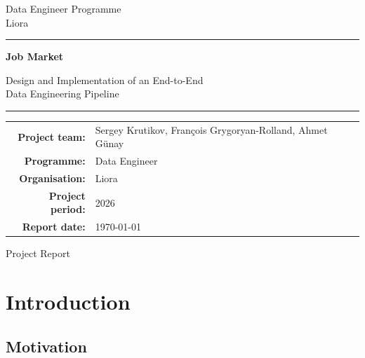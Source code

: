 \documentclass[11pt,a4paper]{article}
\begin{document}
\begin{titlepage}
	\centering
	
	\vspace*{2cm}
	
	{\large
		Data Engineer Programme\\
		Liora
		\par}
	
	\vspace{2.5cm}
	
	{\color{titleblue}\rule{\textwidth}{1.5pt}}
	
	\vspace{0.8cm}
	
	{\Huge\bfseries
		Job Market
		\par}
	
	\vspace{0.5cm}
	
	{\Large
		Design and Implementation of an End-to-End\\
		Data Engineering Pipeline
		\par}
	
	\vspace{0.8cm}
	
	{\color{titleblue}\rule{\textwidth}{1.5pt}}
	
	\vfill
	
	\begin{tabular}{rl}
		\textbf{Project team:} &
		Sergey Krutikov, François Grygoryan-Rolland, Ahmet Günay\\[0.5cm]
		
		\textbf{Programme:} & Data Engineer \\[0.2cm]
		\textbf{Organisation:} & Liora \\[0.2cm]
		\textbf{Project period:} & 2026 \\[0.2cm]
		\textbf{Report date:} & \today
	\end{tabular}
	
	\vfill
	
	{\small
		Project Report
		\par}
	
\end{titlepage}
	
\tableofcontents
\newpage




\section{Introduction}


\subsection{Motivation}
\end{document}
